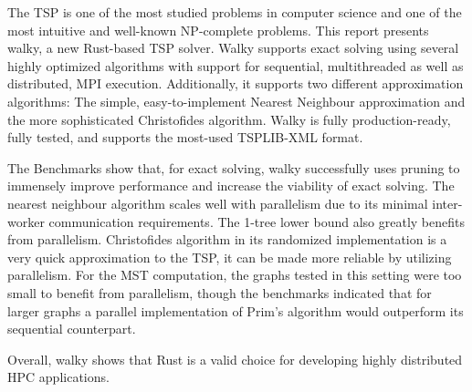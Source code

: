 The \ac{TSP} is one of the most studied problems in computer science and one of the most intuitive and well-known NP-complete problems. This report presents walky, a new Rust-based \ac{TSP} solver. Walky supports exact solving using several highly optimized algorithms with support for sequential, multithreaded as well as distributed, MPI execution. Additionally, it supports two different approximation algorithms: The simple, easy-to-implement Nearest Neighbour approximation and the more sophisticated Christofides algorithm. Walky is fully production-ready, fully tested, and supports the most-used TSPLIB-XML format.

The Benchmarks show that, for exact solving, walky successfully uses pruning to immensely improve performance and increase the viability of exact solving. The nearest neighbour algorithm scales well with parallelism due to its minimal inter-worker communication requirements. The 1-tree lower bound also greatly benefits from parallelism. Christofides algorithm in its randomized implementation is a very quick
approximation to the TSP, it can be made more reliable by
utilizing parallelism. For the MST computation, the graphs tested in this setting were
too small to benefit from parallelism, though the benchmarks indicated that for larger
graphs a parallel implementation of Prim’s algorithm would outperform its sequential
counterpart.

Overall, walky shows that Rust is a valid choice for developing highly distributed \ac{HPC} applications.
